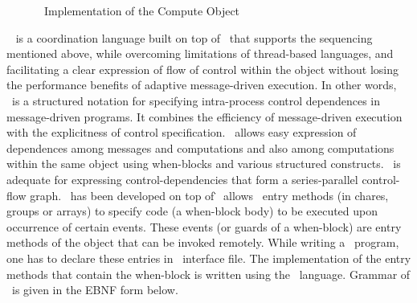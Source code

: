 \begin{figure}
\begin{center}
\end{center}
\caption{\sdag\ Implementation of the Compute Object}
\label{figsdagexample}
\end{figure}

\sdag\ \cite{StructDaggerEURO96}  is a coordination language built on top of
\charmpp\ that supports the sequencing mentioned above,
while overcoming limitations of thread-based languages, and
facilitating a clear expression of flow of control within the object
without losing the performance benefits of adaptive message-driven
execution.  In other words, \sdag\ is a structured notation for
specifying intra-process control dependences in message-driven
programs. It combines the efficiency of message-driven execution with
the explicitness of control specification. \sdag\ allows easy
expression of dependences among messages and computations and also
among computations within the same object using when-blocks and
various structured constructs.  \sdag\ is adequate for expressing
control-dependencies that form a series-parallel control-flow graph.
\sdag\ has been developed on top of \charmpp\. \sdag\ allows
\charmpp\ entry methods (in chares, groups or arrays) to specify
code (a when-block body) to be executed upon occurrence of certain events. 
These events (or guards of a when-block) are entry methods of the object that
can be invoked remotely. While writing a \sdag\ program, one has to declare these
entries in \charmpp\ interface file. The implementation of the
entry methods that contain the when-block is written using the \sdag\
language. Grammar of \sdag\ is given in the EBNF form below.

